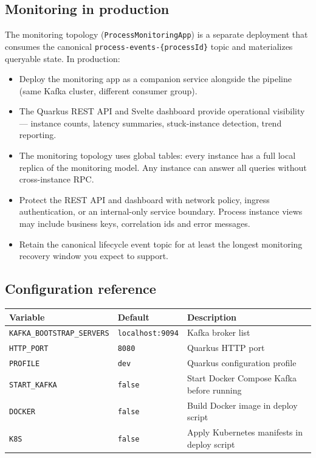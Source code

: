 \subsection{Monitoring in production}

The monitoring topology (\texttt{ProcessMonitoringApp}) is a separate
deployment that consumes the canonical \texttt{process-events-\{processId\}} topic and
materializes queryable state. In production:

\begin{itemize}
\item Deploy the monitoring app as a companion service alongside the pipeline
  (same Kafka cluster, different consumer group).
\item The Quarkus REST API and Svelte dashboard provide operational visibility ---
  instance counts, latency summaries, stuck-instance detection, trend reporting.
\item The monitoring topology uses global tables: every instance has a full
  local replica of the monitoring model. Any instance can answer all queries
  without cross-instance RPC.
\item Protect the REST API and dashboard with network policy, ingress
  authentication, or an internal-only service boundary. Process instance views
  may include business keys, correlation ids and error messages.
\item Retain the canonical lifecycle event topic for at least the longest
  monitoring recovery window you expect to support.
\end{itemize}

\subsection{Configuration reference}

\begin{longtable}{|>{\raggedright\arraybackslash}p{}|>{\raggedright\arraybackslash}p{}|>{\raggedright\arraybackslash}p{}|}
\hline
\rowcolor[gray]{0.9}\textbf{Variable} & \textbf{Default} & \textbf{Description} \\
\hline
\texttt{KAFKA\_BOOTSTRAP\_SERVERS} & \texttt{localhost:9094} & Kafka broker list \\
\texttt{HTTP\_PORT} & \texttt{8080} & Quarkus HTTP port \\
\texttt{PROFILE} & \texttt{dev} & Quarkus configuration profile \\
\texttt{START\_KAFKA} & \texttt{false} & Start Docker Compose Kafka before running \\
\texttt{DOCKER} & \texttt{false} & Build Docker image in deploy script \\
\texttt{K8S} & \texttt{false} & Apply Kubernetes manifests in deploy script \\
\hline
\end{longtable}
